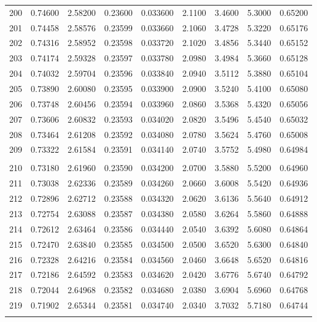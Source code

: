 \documentclass[letter,twosides,10pt]{article}
\begin{document}
\begin{longtable}{|c|c|c|c|c|c|c|c|c|}
200 & 0.74600 & 2.58200 & 0.23600 & 0.033600 & 2.1100 & 3.4600 & 5.3000 & 0.65200 \\
201 & 0.74458 & 2.58576 & 0.23599 & 0.033660 & 2.1060 & 3.4728 & 5.3220 & 0.65176 \\
202 & 0.74316 & 2.58952 & 0.23598 & 0.033720 & 2.1020 & 3.4856 & 5.3440 & 0.65152 \\
203 & 0.74174 & 2.59328 & 0.23597 & 0.033780 & 2.0980 & 3.4984 & 5.3660 & 0.65128 \\
204 & 0.74032 & 2.59704 & 0.23596 & 0.033840 & 2.0940 & 3.5112 & 5.3880 & 0.65104 \\
205 & 0.73890 & 2.60080 & 0.23595 & 0.033900 & 2.0900 & 3.5240 & 5.4100 & 0.65080 \\
206 & 0.73748 & 2.60456 & 0.23594 & 0.033960 & 2.0860 & 3.5368 & 5.4320 & 0.65056 \\
207 & 0.73606 & 2.60832 & 0.23593 & 0.034020 & 2.0820 & 3.5496 & 5.4540 & 0.65032 \\
208 & 0.73464 & 2.61208 & 0.23592 & 0.034080 & 2.0780 & 3.5624 & 5.4760 & 0.65008 \\
209 & 0.73322 & 2.61584 & 0.23591 & 0.034140 & 2.0740 & 3.5752 & 5.4980 & 0.64984 \\
 & & & & & & & & \\
210 & 0.73180 & 2.61960 & 0.23590 & 0.034200 & 2.0700 & 3.5880 & 5.5200 & 0.64960 \\
211 & 0.73038 & 2.62336 & 0.23589 & 0.034260 & 2.0660 & 3.6008 & 5.5420 & 0.64936 \\
212 & 0.72896 & 2.62712 & 0.23588 & 0.034320 & 2.0620 & 3.6136 & 5.5640 & 0.64912 \\
213 & 0.72754 & 2.63088 & 0.23587 & 0.034380 & 2.0580 & 3.6264 & 5.5860 & 0.64888 \\
214 & 0.72612 & 2.63464 & 0.23586 & 0.034440 & 2.0540 & 3.6392 & 5.6080 & 0.64864 \\
215 & 0.72470 & 2.63840 & 0.23585 & 0.034500 & 2.0500 & 3.6520 & 5.6300 & 0.64840 \\
216 & 0.72328 & 2.64216 & 0.23584 & 0.034560 & 2.0460 & 3.6648 & 5.6520 & 0.64816 \\
217 & 0.72186 & 2.64592 & 0.23583 & 0.034620 & 2.0420 & 3.6776 & 5.6740 & 0.64792 \\
218 & 0.72044 & 2.64968 & 0.23582 & 0.034680 & 2.0380 & 3.6904 & 5.6960 & 0.64768 \\
219 & 0.71902 & 2.65344 & 0.23581 & 0.034740 & 2.0340 & 3.7032 & 5.7180 & 0.64744 \\
 & & & & & & & & \\

\end{longtable}
\end{document}
